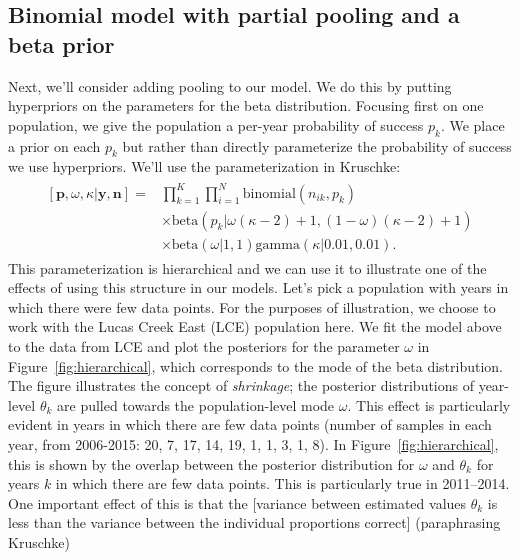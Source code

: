 \documentclass[12pt, oneside, titlepage]{article}   	%
\begin{document}
\subsection*{Binomial model with partial pooling and a beta prior}

Next, we'll consider adding pooling to our model. We do this by putting hyperpriors on the parameters for the beta distribution. Focusing first on one population, we give the population a per-year probability of success $p_k$. We place a prior on each $p_{k}$ but rather than directly parameterize the probability of success we use hyperpriors. We'll use the parameterization in Kruschke:
%
\begin{align}
  \begin{split}
[\bm{p},\omega,\kappa|\bm{y},\bm{n}]  = & \prod_{k=1}^K\prod_{i=1}^N \mathrm{binomial}(n_{ik},p_{k}) 
    \\ & \times \mathrm{beta} (  p_{k} | \omega(\kappa-2) +1 , (1-\omega) (\kappa -2) + 1) 
    \\ & \times \mathrm{beta} ( \omega | 1, 1) \mathrm{gamma} ( \kappa | 0.01, 0.01)  .
  \end{split}
\end{align}
%
This parameterization is hierarchical and we can use it to illustrate one of the effects of using this structure in our models. Let's pick a population with years in which there were few data points. For the purposes of illustration, we choose to work with the Lucas Creek East (LCE) population here. We fit the model above to the data from LCE and plot the posteriors for the parameter $\omega$ in Figure~\ref{fig:hierarchical}, which corresponds to the mode of the beta distribution. The figure illustrates the concept of \textit{shrinkage}; the posterior distributions of year-level $\theta_k$ are pulled towards the population-level mode $\omega$. This effect is particularly evident in years in which there are few data points (number of samples in each year, from 2006-2015: 20, 7, 17, 14, 19, 1, 1, 3, 1, 8). In Figure~\ref{fig:hierarchical}, this is shown by the overlap between the posterior distribution for $\omega$ and $\theta_k$ for years $k$ in which there are few data points. This is particularly true in 2011--2014. One important effect of this is that the [variance between estimated values $\theta_k$ is less than the variance between the individual proportions correct] (paraphrasing Kruschke)
\end{document}
